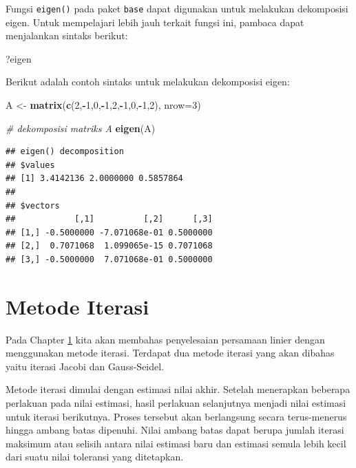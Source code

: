 \documentclass[]{book}
\newenvironment{Shaded}{\begin{snugshade}}{\end{snugshade}}
\newcommand{\CommentTok}[1]{\textcolor[rgb]{0.56,0.35,0.01}{\textit{#1}}}
\newcommand{\DataTypeTok}[1]{\textcolor[rgb]{0.13,0.29,0.53}{#1}}
\newcommand{\DecValTok}[1]{\textcolor[rgb]{0.00,0.00,0.81}{#1}}
\newcommand{\KeywordTok}[1]{\textcolor[rgb]{0.13,0.29,0.53}{\textbf{#1}}}
\newcommand{\NormalTok}[1]{#1}
\newcommand{\OperatorTok}[1]{\textcolor[rgb]{0.81,0.36,0.00}{\textbf{#1}}}
\newcommand{\StringTok}[1]{\textcolor[rgb]{0.31,0.60,0.02}{#1}}
\theoremstyle{definition}
\theoremstyle{definition}
\theoremstyle{definition}
\theoremstyle{remark}
\begin{document}
Fungsi \texttt{eigen()} pada paket \texttt{base} dapat digunakan untuk melakukan dekomposisi eigen. Untuk mempelajari lebih jauh terkait fungsi ini, pambaca dapat menjalankan sintaks berikut:

\begin{Shaded}
\begin{Highlighting}[]
\NormalTok{?eigen}
\end{Highlighting}
\end{Shaded}

Berikut adalah contoh sintaks untuk melakukan dekomposisi eigen:

\begin{Shaded}
\begin{Highlighting}[]
\NormalTok{A <-}\StringTok{ }\KeywordTok{matrix}\NormalTok{(}\KeywordTok{c}\NormalTok{(}\DecValTok{2}\NormalTok{,}\OperatorTok{-}\DecValTok{1}\NormalTok{,}\DecValTok{0}\NormalTok{,}\OperatorTok{-}\DecValTok{1}\NormalTok{,}\DecValTok{2}\NormalTok{,}\OperatorTok{-}\DecValTok{1}\NormalTok{,}\DecValTok{0}\NormalTok{,}\OperatorTok{-}\DecValTok{1}\NormalTok{,}\DecValTok{2}\NormalTok{), }\DataTypeTok{nrow=}\DecValTok{3}\NormalTok{)}

\CommentTok{# dekomposisi matriks A}
\KeywordTok{eigen}\NormalTok{(A)}
\end{Highlighting}
\end{Shaded}

\begin{verbatim}
## eigen() decomposition
## $values
## [1] 3.4142136 2.0000000 0.5857864
## 
## $vectors
##            [,1]          [,2]      [,3]
## [1,] -0.5000000 -7.071068e-01 0.5000000
## [2,]  0.7071068  1.099065e-15 0.7071068
## [3,] -0.5000000  7.071068e-01 0.5000000
\end{verbatim}

\hypertarget{iteratif}{%
\section{Metode Iterasi}\label{iteratif}}

Pada Chapter \ref{iteratif} kita akan membahas penyelesaian persamaan linier dengan menggunakan metode iterasi. Terdapat dua metode iterasi yang akan dibahas yaitu iterasi Jacobi dan Gauss-Seidel.

Metode iterasi dimulai dengan estimasi nilai akhir. Setelah menerapkan beberapa perlakuan pada nilai estimasi, hasil perlakuan selanjutnya menjadi nilai estimasi untuk iterasi berikutnya. Proses tersebut akan berlangsung secara terus-menerus hingga ambang batas dipenuhi. Nilai ambang batas dapat berupa jumlah iterasi maksimum atau selisih antara nilai estimasi baru dan estimasi semula lebih kecil dari suatu nilai toleransi yang ditetapkan.
\end{document}
